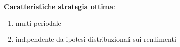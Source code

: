 \textbf{Caratteristiche strategia ottima}:
	\begin{enumerate}
		\item multi-periodale
		\item indipendente da ipotesi distribuzionali sui rendimenti
	\end{enumerate}